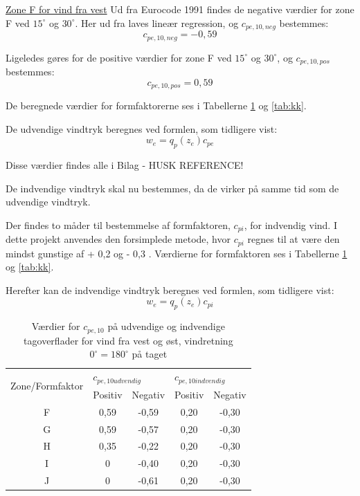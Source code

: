 \underline{Zone F for vind fra vest}
\newline
Ud fra Eurocode 1991 \citep[ tabel 7.4a kapitel 7.2.5]{EU91} findes de negative værdier for zone F ved $15^{\circ}$ og $30^{\circ}$. Her ud fra laves lineær regression, og $c_{pe,10,neg}$ bestemmes:
\begin{equation}
	c_{pe,10,neg} = -0,\!59
\end{equation}

Ligeledes gøres for de positive værdier for zone F ved $15^{\circ}$ og $30^{\circ}$, og $c_{pe,10,pos}$ bestemmes:
\begin{equation}
	c_{pe,10,pos}=0,\!59
\end{equation}

De beregnede værdier for formfaktorerne ses i Tabellerne \ref{tab:cc} og \ref{tab:kk}. 


De udvendige vindtryk beregnes ved formlen, som tidligere vist:
\begin{equation} 
	w_e=q_p(z_e)c_{pe}
\end{equation}

Disse værdier findes alle i Bilag - HUSK REFERENCE! 


De indvendige vindtryk skal nu bestemmes, da de virker på samme tid som de udvendige vindtryk.


Der findes to måder til bestemmelse af formfaktoren, $c_{pi}$, for indvendig vind. I dette projekt anvendes den forsimplede metode, hvor $c_{pi}$ regnes til at være den mindst gunstige af + 0,2 og - 0,3 \citep[Kapitel 7]{EU91}. Værdierne for formfaktoren ses i Tabellerne \ref{tab:cc} og \ref{tab:kk}.


Herefter kan de indvendige vindtryk beregnes ved formlen, som tidligere vist:
\begin{equation} 
	w_e=q_p(z_e)c_{pi}
\end{equation}

\begin{table}[htb]
	\begin{center}
		\begin{tabular}{ c c c c c } 
			\hline
			\multirow{2}{*}{Zone/Formfaktor} & \multicolumn{2}{l}{$c_{pe,10 udvendig}$} & \multicolumn{2}{l}{$c_{pe,10 indvendig}$} \\ 
			& Positiv & Negativ & Positiv & Negativ \\ \hline
			F & 0,59 & -0,59 & 0,20 & -0,30 \\
			G & 0,59 & -0,57 & 0,20 & -0,30 \\
			H & 0,35 & -0,22 & 0,20 & -0,30 \\ 
			I & 0 & -0,40 & 0,20 & -0,30 \\	
			J & 0 & -0,61 & 0,20 & -0,30 \\	
		\end{tabular}
		\caption{Værdier for $c_{pe,10}$ på udvendige og indvendige tagoverflader for vind fra vest og øst, vindretning $0^{\circ} = 180^{\circ}$ på taget}
		\label{tab:cc}
	\end{center}
\end{table}

